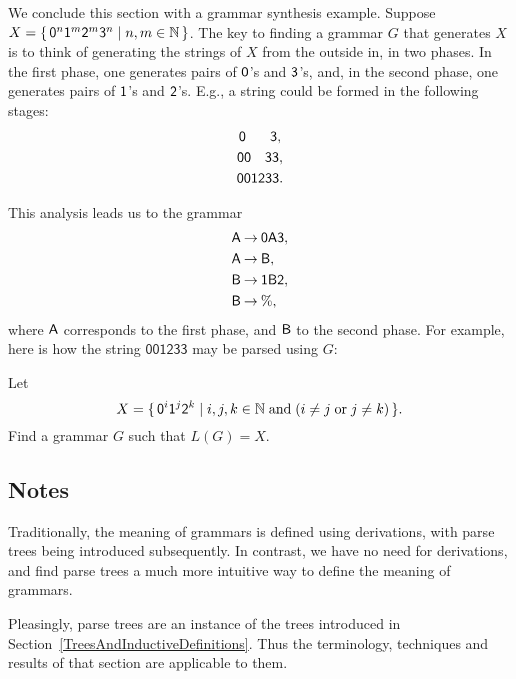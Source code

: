 \label{grammar!synthesis}
We conclude this section with a grammar synthesis example.  Suppose
$X=\{ \, \mathsf{0}^n\mathsf{1}^m\mathsf{2}^m\mathsf{3}^n \mid n,m\in\mathbb{N} \, \}$.  The key
to finding a grammar $G$ that generates $X$ is to think of generating
the strings of $X$ from the outside in, in two phases.  In the first
phase, one generates pairs of $\mathsf{0}$'s and $\mathsf{3}$'s, and, in
the second phase, one generates pairs of $\mathsf{1}$'s and $\mathsf{2}$'s.
E.g., a string could be formed in the following stages:
\begin{gather*}
{\mathsf{0\hspace{.6cm}3,}} \\
{\mathsf{00\hspace{.34cm}33,}} \\
{\mathsf{001233.}}
\end{gather*}

This analysis leads us to the grammar
\begin{align*}
\mathsf{A} &\mathbin{\to} \mathsf{0}\mathsf{A}\mathsf{3} , \\
\mathsf{A} &\mathbin{\to} \mathsf{B} , \\
\mathsf{B} &\mathbin{\to} \mathsf{1}\mathsf{B}\mathsf{2} , \\
\mathsf{B} &\mathbin{\to} \% ,
\end{align*}
where $\mathsf{A}$ corresponds to the first phase, and $\mathsf{B}$ to the
second phase.
For example, here is how the string $\mathsf{001233}$ may be
parsed using $G$:
\begin{center}

\end{center}

\begin{exercise}
Let
\begin{displaymath}
X = \{ \, \mathsf{0}^i\mathsf{1}^j\mathsf{2}^k \mid i,j,k\in\mathbb{N}\;\allowbreak\mbox{and}\allowbreak\;
(i\neq j\;\allowbreak\mbox{or}\allowbreak\;j\neq k) \, \} .
\end{displaymath}
Find a grammar $G$ such that $L(G)=X$.
\end{exercise}

\subsection{Notes}

Traditionally, the meaning of grammars is defined using derivations,
with parse trees being introduced subsequently.  In contrast, we have
no need for derivations, and find parse trees a much more intuitive
way to define the meaning of grammars.

Pleasingly, parse trees are an instance of the trees introduced in
Section~\ref{TreesAndInductiveDefinitions}.  Thus the terminology,
techniques and results of that section are applicable to them.


